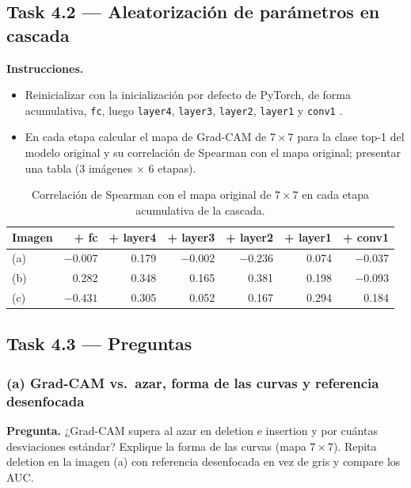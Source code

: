 \documentclass[11pt]{article}
\renewcommand{\_}{\textunderscore\allowbreak{}}
\begin{document}
\subsection*{Task 4.2 --- Aleatorización de parámetros en cascada}
\textbf{Instrucciones.}
\begin{itemize}
  \item Reinicializar con la inicialización por defecto de PyTorch, de forma acumulativa, \texttt{fc}, luego \texttt{layer4}, \texttt{layer3}, \texttt{layer2}, \texttt{layer1} y \texttt{conv1} \cite{adebayo2018}.
  \item En cada etapa calcular el mapa de Grad-CAM de $7\times7$ para la clase top-1 del modelo original y su correlación de Spearman con el mapa original; presentar una tabla (3 imágenes $\times$ 6 etapas).
\end{itemize}

\begin{table}[H]
\centering
\small
\begin{tabular}{lrrrrrr}
\toprule
Imagen & + fc & + layer4 & + layer3 & + layer2 & + layer1 & + conv1 \\
\midrule
(a) & $-0.007$ & 0.179 & $-0.002$ & $-0.236$ & 0.074 & $-0.037$ \\
(b) & 0.282 & 0.348 & 0.165 & 0.381 & 0.198 & $-0.093$ \\
(c) & $-0.431$ & 0.305 & 0.052 & 0.167 & 0.294 & 0.184 \\
\bottomrule
\end{tabular}
\caption{Correlación de Spearman con el mapa original de $7\times7$ en cada etapa acumulativa de la cascada.}
\end{table}

\subsection*{Task 4.3 --- Preguntas}
\subsubsection*{(a) Grad-CAM vs.\ azar, forma de las curvas y referencia desenfocada}
\begin{tcolorbox}[colback=yellow!12, colframe=orange!70!black, boxrule=0.5pt, left=4pt, right=4pt]
\textbf{Pregunta.} ¿Grad-CAM supera al azar en deletion e insertion y por cuántas desviaciones estándar? Explique la forma de las curvas (mapa \(7\times7\)). Repita deletion en la imagen (a) con referencia desenfocada en vez de gris y compare los AUC.
\end{tcolorbox}
\end{document}
